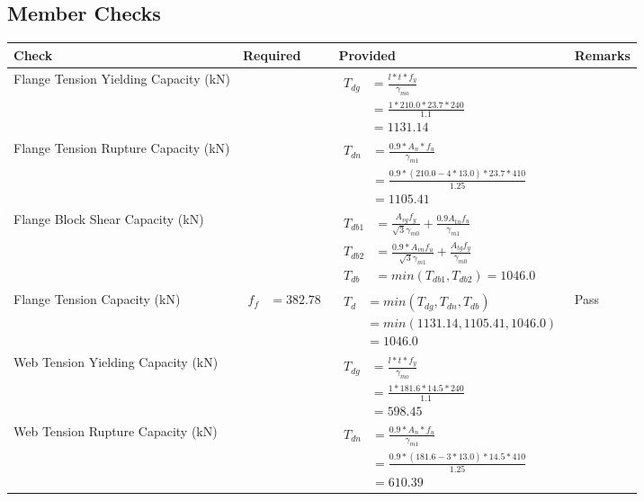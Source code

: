 \documentclass{article}%
\begin{document}
%
\newpage%
\subsection{Member Checks}%
\label{subsec:MemberChecks}%
\renewcommand{\arraystretch}{1.2}%
\begin{longtable}{|p{4cm}|p{6cm}|p{5.5cm}|p{1.5cm}|}%
\hline%
\rowcolor{OsdagGreen}%
Check&Required&Provided&Remarks\\%
\hline%
\endhead%
\hline%
Flange Tension Yielding Capacity (kN)&&$\begin{aligned} T_{dg} &= \frac{l*t*f_y}{\gamma_{mo}}\\ &=\frac{1*210.0*23.7*240}{1.1}\\ &=1131.14\end{aligned}$&\\%
\hline%
Flange Tension Rupture Capacity (kN)&&$\begin{aligned} T_{dn} &= \frac{0.9*A_{n}*f_u}{\gamma_{m1}}\\ &=\frac{0.9*(210.0-4*13.0)*23.7*410}{1.25}\\ &=1105.41\end{aligned}$&\\%
\hline%
Flange Block Shear Capacity (kN)&&$\begin{aligned}T_{db1} &= \frac{A_{vg} f_{y}}{\sqrt{3} \gamma_{m0}} + \frac{0.9 A_{tn} f_{u}}{\gamma_{m1}}\\ T_{db2} &= \frac{0.9*A_{vn} f_{u}}{\sqrt{3} \gamma_{m1}} + \frac{A_{tg} f_{y}}{\gamma_{m0}}\\ T_{db} &= min(T_{db1}, T_{db2})= 1046.0\end{aligned}$&\\%
\hline%
Flange Tension Capacity (kN)&$\begin{aligned} f_f &=382.78\end{aligned}$&$\begin{aligned} T_d &= min(T_{dg},T_{dn},T_{db})\\ &= min(1131.14,1105.41,1046.0)\\ &=1046.0\end{aligned}$&Pass\\%
\hline%
Web Tension Yielding Capacity (kN)&&$\begin{aligned} T_{dg} &= \frac{l*t*f_y}{\gamma_{mo}}\\ &=\frac{1*181.6*14.5*240}{1.1}\\ &=598.45\end{aligned}$&\\%
\hline%
Web Tension Rupture Capacity (kN)&&$\begin{aligned} T_{dn} &= \frac{0.9*A_{n}*f_u}{\gamma_{m1}}\\ &=\frac{0.9*(181.6-3*13.0)*14.5*410}{1.25}\\ &=610.39\end{aligned}$&\\%

\end{longtable}
\end{document}
